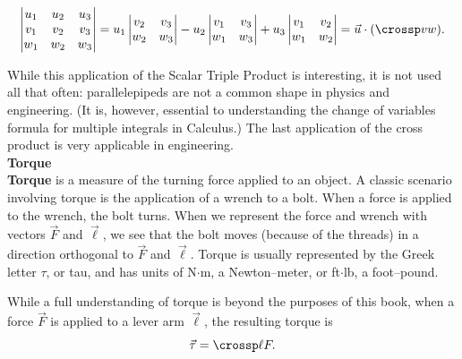 \[
\begin{vmatrix} u_1 & u_2 & u_3\\ v_1 & v_2 & v_3\\ w_1 & w_2 & w_3\end{vmatrix} = u_1 \begin{vmatrix} v_2 & v_3\\ w_2 & w_3\end{vmatrix} - u_2\begin{vmatrix} v_1 & v_3\\ w_1 & w_3\end{vmatrix} + u_3\begin{vmatrix} v_1 & v_2\\ w_1 & w_2\end{vmatrix} = \vec u \cdot(\crossp vw).
\]


While this application of the Scalar Triple Product is interesting, it is not used all that often: parallelepipeds are not a common shape in physics and engineering. (It is, however, essential to understanding the change of variables formula for multiple integrals in Calculus.) The last application of the cross product is very applicable in engineering.\\

\noindent\textbf{Torque}\\

\textbf{Torque} is a measure of the turning force applied to an object. A classic scenario involving torque is the application of a wrench to a bolt. When a force is applied to the wrench, the bolt turns. When we represent the force and wrench with vectors $\vec F$ and $\vec \ell$, we see that the bolt moves (because of the threads) in a  direction orthogonal to $\vec F$ and $\vec \ell$. Torque is usually represented by the Greek letter $\tau$, or tau, and has units of N$\cdot$m, a Newton--meter, or ft$\cdot$lb, a foot--pound.

While a full understanding of torque is beyond the purposes of this book, when a force $\vec F$ is applied to a lever arm $\vec \ell$, the resulting torque is \begin{equation}\vec \tau = \crossp \ell F.\label{eq:crossp3}\end{equation}

